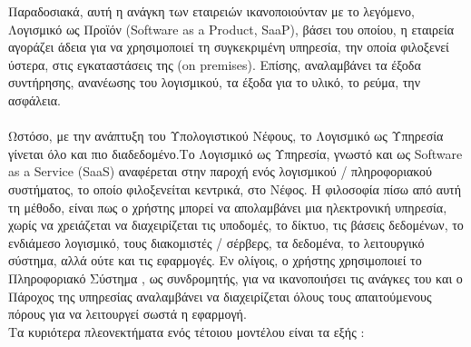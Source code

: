 \documentclass{article}
\begin{document}
Παραδοσιακά, αυτή η ανάγκη των εταιρειών ικανοποιούνταν με το λεγόμενο, Λογισμικό ως Προϊόν (Software as a Product, SaaP), βάσει του οποίου, η εταιρεία αγοράζει άδεια για να χρησιμοποιεί τη συγκεκριμένη υπηρεσία, την οποία φιλοξενεί ύστερα, στις εγκαταστάσεις της (on premises). Επίσης, αναλαμβάνει τα έξοδα συντήρησης, ανανέωσης του λογισμικού, τα έξοδα για το υλικό, το ρεύμα, την ασφάλεια. \\ \\
Ωστόσο, με την ανάπτυξη του Υπολογιστικού Νέφους, το Λογισμικό ως Υπηρεσία γίνεται όλο και πιο διαδεδομένο.Το Λογισμικό ως Υπηρεσία, γνωστό και ως Software as a Service (SaaS) αναφέρεται στην παροχή ενός λογισμικού / πληροφοριακού συστήματος, το οποίο φιλοξενείται κεντρικά, στο Νέφος. Η φιλοσοφία πίσω από αυτή τη μέθοδο, είναι πως ο χρήστης μπορεί να απολαμβάνει μια ηλεκτρονική υπηρεσία, χωρίς να χρειάζεται να διαχειρίζεται τις υποδομές, το δίκτυο, τις βάσεις δεδομένων, το ενδιάμεσο λογισμικό, τους διακομιστές / σέρβερς, τα δεδομένα, το λειτουργικό σύστημα, αλλά ούτε και τις εφαρμογές. Εν ολίγοις, ο χρήστης χρησιμοποιεί το Πληροφοριακό Σύστημα , ως συνδρομητής, για να ικανοποιήσει τις ανάγκες του και ο Πάροχος της υπηρεσίας αναλαμβάνει να διαχειρίζεται όλους τους απαιτούμενους πόρους για να λειτουργεί σωστά η εφαρμογή.  \\ 
Τα κυριότερα πλεονεκτήματα ενός τέτοιου μοντέλου είναι τα εξής :
\end{document}
